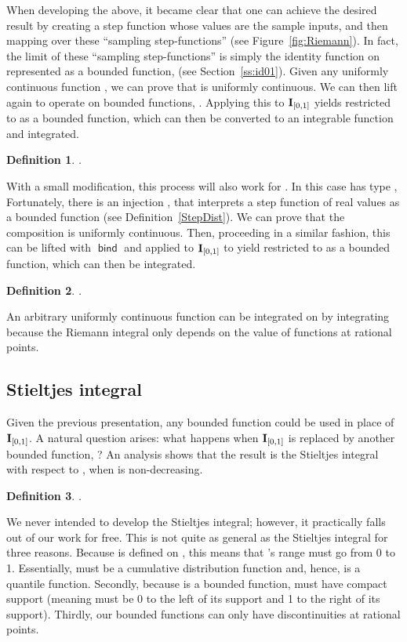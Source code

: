 \documentclass{elsarticle}
\newcommand{\tmop}[1]{\ensuremath{\operatorname{#1}}}
\newcommand{\tmstrong}[1]{\textbf{#1}}
\newcommand{\tmtextup}[1]{{\upshape{#1}}}
\newtheorem{definition}{Definition}
\newcommand{\uc}{uniformly continuous}
\newcommand{\fastBind}{\ensuremath{\tmop{\mathsf{bind}}}}
\newcommand{\id}{\text{{\tmstrong{\tmtextup{I}}}}}
\newcommand{\idzeroone}{\ensuremath{\id_{[0, 1]}}}
\begin{document}
When developing the above, it became clear that one can
achieve the desired result by creating a step function whose values are the
sample inputs, and then mapping  over these ``sampling step-functions''
(see Figure~\ref{fig:Riemann}). In fact, the limit of these
``sampling step-functions'' is simply the identity function on 
represented as a bounded function,  (see
Section~\ref{ss:id01}). Given any {\uc} function , we can prove that  is {\uc}. We can then
lift again to operate on bounded functions, . Applying this to {\idzeroone} yields  restricted to 
as a bounded function, which can then be converted to an integrable function
and integrated.

\begin{definition}
  .
\end{definition}

With a small modification, this process will also work for . In this case  has type , Fortunately, there is an injection
, that
interprets a step function of real values as a bounded function (see
Definition~\ref{StepDist}). We can prove that the composition
 is {\uc}. Then, proceeding in a similar
fashion, this can be lifted with {\fastBind} and applied to {\idzeroone} to
yield  restricted to  as a bounded function, which can then be
integrated.

\begin{definition}
  .
\end{definition}

An arbitrary uniformly continuous function 
can be integrated on  by integrating  because the
Riemann integral only depends on the value of functions at rational points.

\subsection{Stieltjes integral}\label{ss:stieltjes}Given the previous
presentation, any bounded function could be used in place of {\idzeroone}. A
natural question arises: what happens when {\idzeroone} is replaced by another
bounded function, ? An analysis shows that the result is
the Stieltjes integral with respect to , when  is non-decreasing.

\begin{definition}
  .
\end{definition}

We never intended to develop the Stieltjes integral; however, it practically
falls out of our work for free. This is not quite as general as the Stieltjes
integral for three reasons. Because  is defined on , this means that
's range must go from 0 to 1. Essentially,  must be a
cumulative distribution function and, hence,  is a quantile
function. Secondly, because  is a bounded function,  must have
compact support (meaning  must be 0 to the left of its support and
1 to the right of its support). Thirdly, our bounded functions can only have
discontinuities at rational points.
\end{document}
